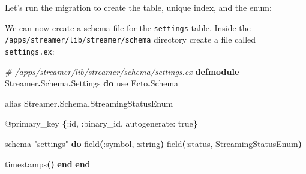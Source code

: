\documentclass[
  oneside]{book}
\newenvironment{Shaded}{\begin{snugshade}}{\end{snugshade}}
\newcommand{\CommentTok}[1]{\textcolor[rgb]{0.56,0.35,0.01}{\textit{#1}}}
\newcommand{\ConstantTok}[1]{\textcolor[rgb]{0.56,0.35,0.01}{#1}}
\newcommand{\ExtensionTok}[1]{#1}
\newcommand{\FunctionTok}[1]{\textcolor[rgb]{0.13,0.29,0.53}{\textbf{#1}}}
\newcommand{\ImportTok}[1]{#1}
\newcommand{\KeywordTok}[1]{\textcolor[rgb]{0.13,0.29,0.53}{\textbf{#1}}}
\newcommand{\NormalTok}[1]{#1}
\newcommand{\OperatorTok}[1]{\textcolor[rgb]{0.81,0.36,0.00}{\textbf{#1}}}
\newcommand{\OtherTok}[1]{\textcolor[rgb]{0.56,0.35,0.01}{#1}}
\newcommand{\PreprocessorTok}[1]{\textcolor[rgb]{0.56,0.35,0.01}{\textit{#1}}}
\newcommand{\SpecialStringTok}[1]{\textcolor[rgb]{0.31,0.60,0.02}{#1}}
\newcommand{\StringTok}[1]{\textcolor[rgb]{0.31,0.60,0.02}{#1}}
\newcommand{\VariableTok}[1]{\textcolor[rgb]{0.00,0.00,0.00}{#1}}
\begin{document}
Let's run the migration to create the table, unique index, and the enum:

\begin{Shaded}
\end{Shaded}

We can now create a schema file for the \texttt{settings} table. Inside the\\
\texttt{/apps/streamer/lib/streamer/schema} directory create a file called \texttt{settings.ex}:

\begin{Shaded}
\begin{Highlighting}[]
\CommentTok{\# /apps/streamer/lib/streamer/schema/settings.ex}
\KeywordTok{defmodule} \ConstantTok{Streamer}\OperatorTok{.}\ConstantTok{Schema}\OperatorTok{.}\ConstantTok{Settings} \KeywordTok{do}
  \ImportTok{use} \ConstantTok{Ecto}\OperatorTok{.}\ConstantTok{Schema}

  \ImportTok{alias} \ConstantTok{Streamer}\OperatorTok{.}\ConstantTok{Schema}\OperatorTok{.}\ConstantTok{StreamingStatusEnum}

  \OtherTok{@primary\_key} \FunctionTok{\{}\VariableTok{:id}\NormalTok{, }\VariableTok{:binary\_id}\NormalTok{, }\VariableTok{autogenerate:} \ConstantTok{true}\FunctionTok{\}}

\NormalTok{  schema }\StringTok{"settings"} \KeywordTok{do}
\NormalTok{    field}\FunctionTok{(}\VariableTok{:symbol}\NormalTok{, }\VariableTok{:string}\FunctionTok{)}
\NormalTok{    field}\FunctionTok{(}\VariableTok{:status}\NormalTok{, }\ConstantTok{StreamingStatusEnum}\FunctionTok{)}

\NormalTok{    timestamps}\FunctionTok{()}
  \KeywordTok{end}
\KeywordTok{end}
\end{Highlighting}
\end{Shaded}
\end{document}
